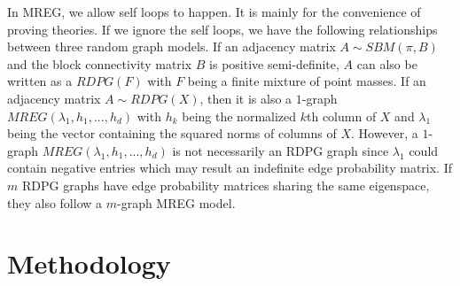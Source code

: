 \documentclass[10pt,journal,compsoc]{IEEEtran}
\begin{document}
\noindent In MREG, we allow self loops to happen. It is mainly for the convenience of proving theories. If we ignore the self loops, we have the following relationships between three random graph models. If an adjacency matrix $A \sim SBM(\pi,B)$ and the block connectivity matrix $B$ is positive semi-definite, $A$ can also be written as a $RDPG(F)$ with $F$ being a finite mixture of point masses. If an adjacency matrix $A \sim RDPG(X)$, then it is also a $1$-graph $MREG(\lambda_1,h_1,...,h_d)$ with $h_k$ being the normalized $k$th column of $X$ and $\lambda_1$ being the vector containing the squared norms of columns of $X$. However, a $1$-graph $MREG(\lambda_1,h_1,...,h_d)$ is not necessarily an RDPG graph since $\lambda_1$ could contain negative entries which may result an indefinite edge probability matrix. If $m$ RDPG graphs have edge probability matrices sharing the same eigenspace, they also follow a $m$-graph MREG model. 

\section{Methodology}
\end{document}

